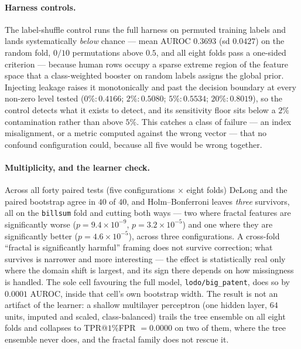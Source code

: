 \documentclass{article}
\begin{document}
\paragraph{Harness controls.} The label-shuffle control runs the full harness on
permuted training labels and lands systematically \emph{below} chance --- mean AUROC
$0.3693$ (sd $0.0427$) on the random fold, $0/10$ permutations above $0.5$, and all
eight folds pass a one-sided criterion --- because human rows occupy a sparse extreme
region of the feature space that a class-weighted booster on random labels assigns
the global prior. Injecting leakage raises it monotonically and past the decision
boundary at every non-zero level tested ($0\%\!:0.4166$; $2\%\!:0.5080$;
$5\%\!:0.5534$; $20\%\!:0.8019$), so the control detects what it exists to detect,
and its sensitivity floor sits below a $2\%$ contamination rather than above $5\%$.
This catches a class of failure --- an index misalignment, or a metric computed
against the wrong vector --- that no confound configuration could, because all five
would be wrong together.

\paragraph{Multiplicity, and the learner check.} Across all forty paired tests (five
configurations $\times$ eight folds) DeLong and the paired bootstrap agree in $40$ of
$40$, and Holm--Bonferroni leaves \emph{three} survivors, all on the
\texttt{billsum} fold and cutting both ways --- two where fractal features are
significantly worse ($p=9.4\!\times\!10^{-9}$, $p=3.2\!\times\!10^{-5}$) and one
where they are significantly better ($p=4.6\!\times\!10^{-5}$), across three
configurations. A cross-fold ``fractal is significantly harmful'' framing does not
survive correction; what survives is narrower and more interesting --- the effect is
statistically real only where the domain shift is largest, and its sign there depends
on how missingness is handled. The sole cell favouring the full model,
\texttt{lodo/big\_patent}, does so by $0.0001$ AUROC, inside that cell's own
bootstrap width. The result is not an artifact of the learner: a shallow multilayer
perceptron (one hidden layer, $64$ units, imputed and scaled, class-balanced) trails
the tree ensemble on all eight folds and collapses to TPR@$1\%$FPR $=0.0000$ on two
of them, where the tree ensemble never does, and the fractal family does not rescue
it.
\end{document}
